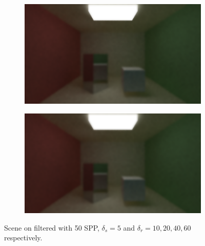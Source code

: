 \documentclass[titlepage,12pt]{report}
\begin{document}
\begin{figure}[H]
	\begin{subfigure}{.48\textwidth}
		\centering
		\includegraphics[scale=0.2]{media/bilateral/cornell_normal_50_bilateral_filter_21_5_40.png}
		\label{bilateral_filter_15}
	\end{subfigure}
	\begin{subfigure}{.48\textwidth}
		\centering
		\includegraphics[scale=0.2]{media/bilateral/cornell_normal_50_bilateral_filter_21_5_60.png}
		\label{bilateral_filter_16}
	\end{subfigure}
	\caption{Scene on filtered with 50 SPP, $\delta_s = 5$ and $\delta_r = 10, 20, 40, 60$ respectively.}
	\label{bilateral_filter_04}
\end{figure}
\end{document}
